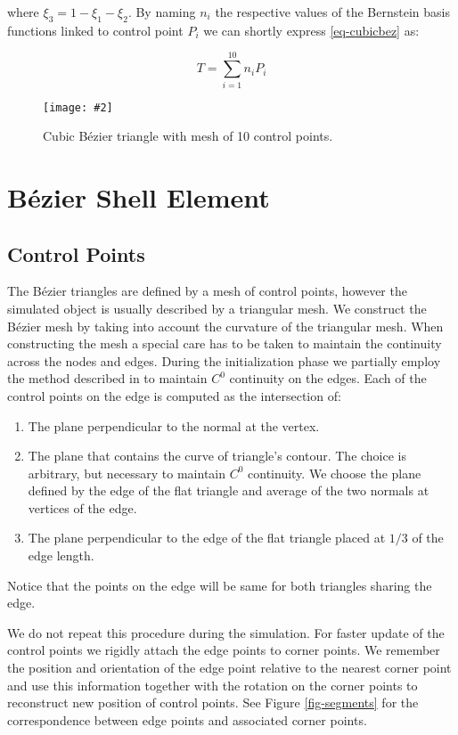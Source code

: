 \documentclass{egpubl}
\newcommand{\Figure}[3]{%
\begin{figure}[htb]
  \centering
  \texttt{[image: \#2]}
  \caption{\label{fig-#2}#3}
\end{figure}}
\begin{document}
\noindent
where $ \xi_3 = 1 - \xi_1 - \xi_2 $. By naming $n_i$ the respective values
of the Bernstein basis functions linked to control point $P_i$ we can
shortly express \eqref{eq-cubicbez} as:

\begin{equation}\label{eq-cubicbez2}
    T = \sum_{i=1}^{10} n_i P_i
\end{equation}

\Figure{0.8\linewidth}{bezier}
{Cubic Bézier triangle with mesh of 10 control points.}




\section{Bézier Shell Element} %


\subsection{Control Points} %

The Bézier triangles are defined by a mesh of control points, however the
simulated object is usually described by a triangular mesh. We construct
the Bézier mesh by taking into account the curvature of the triangular
mesh. When constructing the mesh a special care has to be taken to maintain
the continuity across the nodes and edges. During the initialization phase
we partially employ the method described in \cite{Ubach2010} to maintain
$C^0$ continuity on the edges. Each of the control points on the edge is
computed as the intersection of:

\begin{enumerate}
    \item The plane perpendicular to the normal at the vertex.
    \item The plane that contains the curve of triangle's contour. The
        choice is arbitrary, but necessary to maintain $C^0$ continuity. 
        We choose the plane defined by the edge of the flat triangle and
        average of the two normals at vertices of the edge. 
    \item The plane perpendicular to the edge of the flat triangle placed at
        $1/3$ of the edge length.
\end{enumerate}

Notice that the points on the edge will be same for both triangles sharing
the edge.

We do not repeat this procedure during the simulation. For faster update of
the control points we rigidly attach the edge points to corner points. We
remember the position and orientation of the edge point relative to the
nearest corner point and use this information together with the rotation on
the corner points to reconstruct new position of control points. See Figure
\ref{fig-segments} for the correspondence between edge points and
associated corner points.
\end{document}

